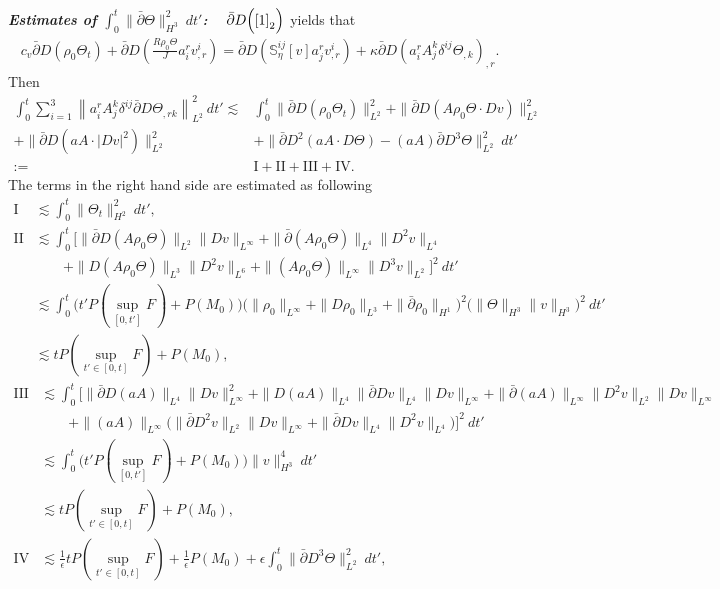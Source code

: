 \documentclass[12pt,a4paper]{amsart}
\numberwithin{equation}{section}
\theoremstyle{plain}
\theoremstyle{definition}
\newcommand{\bpartial}{\bar{\partial}}
\begin{document}
\textsl{\textbf{Estimates of $\int_{0}^{t}\|\bpartial \Theta\|_{H^3}^2\ dt'$:}}~~
$\bpartial D\Big(\eqref{1}_2\Big)$ yields that
\begin{align*}
c_v\bpartial D(\rho_0 \Theta_t)+\bpartial D \left( \frac{R\rho_0\Theta}{J}a^r_iv^i_{,r}\right)=\bpartial D(\mathbb{S}_{\eta}^{ij}[v]a^r_jv^i_{,r})+\kappa \bpartial D (a^r_i A^k_j \delta^{ij}\Theta_{,k})_{,r}.
\end{align*}
Then
\begin{align*}
\int_{0}^{t}\sum\limits_{i=1}^3\left\|a^r_i A^k_j \delta^{ij} \bpartial D\Theta_{,rk} \right\|_{L^2}^2 \ dt'
\lesssim& \int_{0}^{t} \|\bpartial D(\rho_0 \Theta_t)\|_{L^2}^2
   +\| \bpartial D(A\rho_0\Theta\cdot Dv)\|_{L^2}^2\\
   +\| \bpartial D(a A \cdot |Dv|^2)\|_{L^2}^2&
   +\|\bpartial D^2(aA\cdot D\Theta)-(aA)\bpartial D^3 \Theta\|_{L^2}^2\ dt'\\
:=&\mathrm{I}+\mathrm{II}+\mathrm{III} +\mathrm{IV}.
\end{align*}
The terms in the right hand side are estimated as following
\begin{align*}
\mathrm{I}&\lesssim \int_{0}^{t} \|\Theta_t\|_{H^2}^2\ dt',\\
\mathrm{II}&\lesssim \int_{0}^{t} \Big[ 
    \|\bpartial D(A\rho_0\Theta)\|_{L^2} \|Dv\|_{L^{\infty}}
    +\|\bpartial (A\rho_0\Theta)\|_{L^4}\|D^2v\|_{L^4}\\
     &\qquad+ \| D(A\rho_0\Theta)\|_{L^3} \|D^2v\|_{L^6}
     +\| (A\rho_0\Theta)\|_{L^{\infty}}\|D^3v\|_{L^2} \Big]^2 \ dt'\\
&\lesssim \int_{0}^{t} \Big( t'P(\sup\limits_{[0,t']}F)+P(M_0)  \Big)
     \Big(\|\rho_0\|_{L^{\infty}}+\|D\rho_0\|_{L^3}+\|\bpartial \rho_0\|_{H^1}\Big)^2
     \Big(\|\Theta\|_{H^3}\|v\|_{H^3} \Big)^2\ dt'\\
&\lesssim tP(\sup\limits_{t'\in[0,t]}F)+P(M_0),
\end{align*}
\begin{align*}
\mathrm{III}&\lesssim \int_{0}^{t}  \Big[
      \|\bpartial D(aA)\|_{L^4} \|Dv\|_{L^{\infty}}^2
     +\| D (aA)\|_{L^4}  \|\bpartial D v\|_{L^4}\|Dv\|_{L^{\infty}}
     + \| \bpartial (aA)\|_{L^{\infty}}  \|D^2 v\|_{L^2}\|Dv\|_{L^{\infty}}\\
         &\qquad
     +\|(aA)\|_{L^{\infty}}\Big( \|\bpartial D^2 v\|_{L^2}\|Dv\|_{L^{\infty}}+\|\bpartial D v\|_{L^4}\|D^2v\|_{L^4}\Big)\Big]^2 \ dt'\\
&\lesssim  \int_{0}^{t} \Big( t'P(\sup\limits_{[0,t']}F)+P(M_0)  \Big)
      \|v\|_{H^3}^4\ dt'\\
&\lesssim tP(\sup\limits_{t'\in[0,t]}F)+P(M_0),\\
\mathrm{IV}
&\lesssim  \frac{1}{\epsilon}tP(\sup\limits_{t'\in[0,t]}F)+\frac{1}{\epsilon}P(M_0)+\epsilon \int_{0}^{t}\|\bpartial D^3\Theta\|_{L^2}^2 \ dt',
\end{align*}
\end{document}
